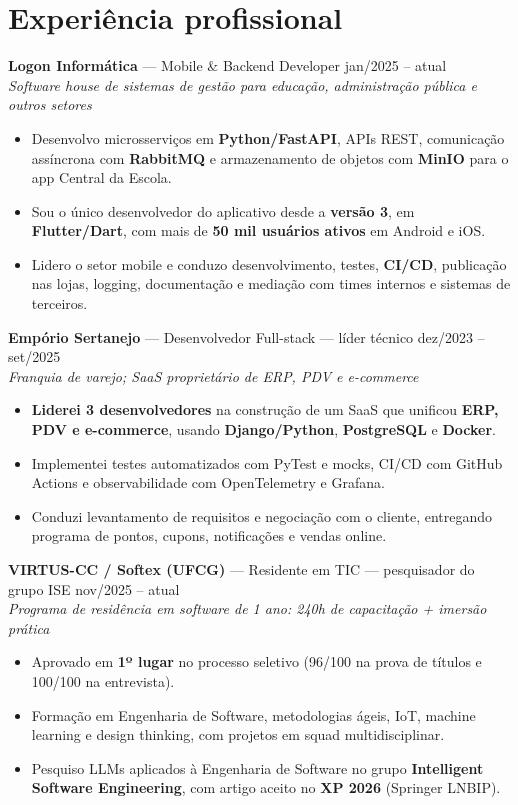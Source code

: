 \documentclass[10.5pt,a4paper]{article}
\newcommand{\cargo}[4]{%
  \Needspace*{5\baselineskip}%
  \textbf{#1} \textnormal{---} #2 \hfill \textnormal{#3}\\
  \textit{\small #4}\vspace{0.4ex}
}
\begin{document}
\section*{Experiência profissional}

\cargo{Logon Informática}{Mobile \& Backend Developer}{jan/2025 -- atual}{Software house de
sistemas de gestão para educação, administração pública e outros setores}
\begin{itemize}
  \item Desenvolvo microsserviços em \textbf{Python/FastAPI}, APIs REST, comunicação assíncrona com
        \textbf{RabbitMQ} e armazenamento de objetos com \textbf{MinIO} para o app Central da Escola.
  \item Sou o único desenvolvedor do aplicativo desde a \textbf{versão 3}, em
        \textbf{Flutter/Dart}, com mais de \textbf{50 mil usuários ativos} em Android e iOS.
  \item Lidero o setor mobile e conduzo desenvolvimento, testes, \textbf{CI/CD}, publicação nas
        lojas, logging, documentação e mediação com times internos e sistemas de terceiros.
\end{itemize}

\cargo{Empório Sertanejo}{Desenvolvedor Full-stack --- líder técnico}{dez/2023 -- set/2025}{Franquia
de varejo; SaaS proprietário de ERP, PDV e e-commerce}
\begin{itemize}
  \item \textbf{Liderei 3 desenvolvedores} na construção de um SaaS que unificou
        \textbf{ERP, PDV e e-commerce}, usando \textbf{Django/Python}, \textbf{PostgreSQL} e
        \textbf{Docker}.
  \item Implementei testes automatizados com PyTest e mocks, CI/CD com GitHub Actions e
        observabilidade com OpenTelemetry e Grafana.
  \item Conduzi levantamento de requisitos e negociação com o cliente, entregando programa de
        pontos, cupons, notificações e vendas online.
\end{itemize}

\cargo{VIRTUS-CC / Softex (UFCG)}{Residente em TIC --- pesquisador do grupo ISE}{nov/2025 --
atual}{Programa de residência em software de 1 ano: 240h de capacitação + imersão prática}
\begin{itemize}
  \item Aprovado em \textbf{1º lugar} no processo seletivo (96/100 na prova de títulos e 100/100 na
        entrevista).
  \item Formação em Engenharia de Software, metodologias ágeis, IoT, machine learning e design
        thinking, com projetos em squad multidisciplinar.
  \item Pesquiso LLMs aplicados à Engenharia de Software no grupo \textbf{Intelligent Software
        Engineering}, com artigo aceito no \textbf{XP 2026} (Springer LNBIP).
\end{itemize}
\end{document}
